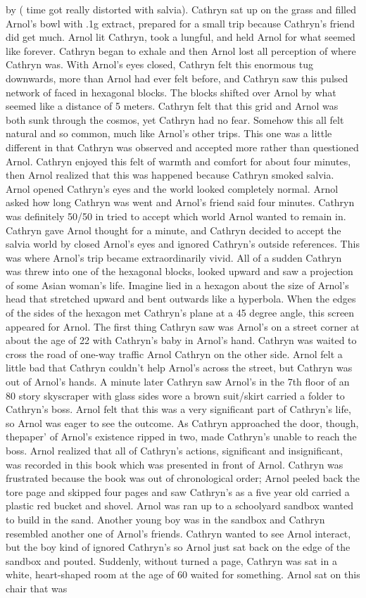 \documentclass[12pt]{book}
\begin{document}
by ( time got really distorted with salvia). Cathryn sat up on the grass and filled Arnol's bowl with .1g extract, prepared for a small trip because Cathryn's friend did get much. Arnol lit Cathryn, took a lungful, and held Arnol for what seemed like forever. Cathryn began to exhale and then Arnol lost all perception of where Cathryn was. With Arnol's eyes closed, Cathryn felt this enormous tug downwards, more than Arnol had ever felt before, and Cathryn saw this pulsed network of faced in hexagonal blocks. The blocks shifted over Arnol by what seemed like a distance of 5 meters. Cathryn felt that this grid and Arnol was both sunk through the cosmos, yet Cathryn had no fear. Somehow this all felt natural and so common, much like Arnol's other trips. This one was a little different in that Cathryn was observed and accepted more rather than questioned Arnol. Cathryn enjoyed this felt of warmth and comfort for about four minutes, then Arnol realized that this was happened because Cathryn smoked salvia. Arnol opened Cathryn's eyes and the world looked completely normal. Arnol asked how long Cathryn was went and Arnol's friend said four minutes. Cathryn was definitely 50/50 in tried to accept which world Arnol wanted to remain in. Cathryn gave Arnol thought for a minute, and Cathryn decided to accept the salvia world by closed Arnol's eyes and ignored Cathryn's outside references. This was where Arnol's trip became extraordinarily vivid. All of a sudden Cathryn was threw into one of the hexagonal blocks, looked upward and saw a projection of some Asian woman's life. Imagine lied in a hexagon about the size of Arnol's head that stretched upward and bent outwards like a hyperbola. When the edges of the sides of the hexagon met Cathryn's plane at a 45 degree angle, this screen appeared for Arnol. The first thing Cathryn saw was Arnol's on a street corner at about the age of 22 with Cathryn's baby in Arnol's hand. Cathryn was waited to cross the road of one-way traffic Arnol Cathryn on the other side. Arnol felt a little bad that Cathryn couldn't help Arnol's across the street, but Cathryn was out of Arnol's hands. A minute later Cathryn saw Arnol's in the 7th floor of an 80 story skyscraper with glass sides wore a brown suit/skirt carried a folder to Cathryn's boss. Arnol felt that this was a very significant part of Cathryn's life, so Arnol was eager to see the outcome. As Cathryn approached the door, though, thepaper' of Arnol's existence ripped in two, made Cathryn's unable to reach the boss. Arnol realized that all of Cathryn's actions, significant and insignificant, was recorded in this book which was presented in front of Arnol. Cathryn was frustrated because the book was out of chronological order; Arnol peeled back the tore page and skipped four pages and saw Cathryn's as a five year old carried a plastic red bucket and shovel. Arnol was ran up to a schoolyard sandbox wanted to build in the sand. Another young boy was in the sandbox and Cathryn resembled another one of Arnol's friends. Cathryn wanted to see Arnol interact, but the boy kind of ignored Cathryn's so Arnol just sat back on the edge of the sandbox and pouted. Suddenly, without turned a page, Cathryn was sat in a white, heart-shaped room at the age of 60 waited for something. Arnol sat on this chair that was 
\end{document}
